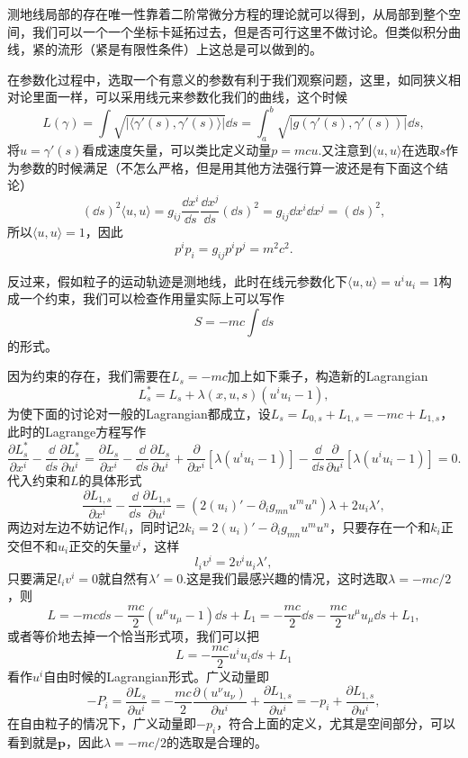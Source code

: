 测地线局部的存在唯一性靠着二阶常微分方程的理论就可以得到，从局部到整个空间，我们可以一个一个坐标卡延拓过去，但是否可行这里不做讨论。但类似积分曲线，紧的流形（紧是有限性条件）上这总是可以做到的。

在参数化过程中，选取一个有意义的参数有利于我们观察问题，这里，如同狭义相对论里面一样，可以采用线元来参数化我们的曲线，这个时候
\[
	L(\gamma)=\int \sqrt{|\langle\gamma'(s),\gamma'(s)\rangle|}\dd s=\int_a^b \sqrt{|g(\gamma'(s),\gamma'(s))|}\dd s,
\]
将$u=\gamma'(s)$看成速度矢量，可以类比定义动量$p=mcu$.又注意到$\langle u,u\rangle$在选取$s$作为参数的时候满足（不怎么严格，但是用其他方法强行算一波还是有下面这个结论）
\[
	(\dd s)^2\langle u, u\rangle=g_{ij}\frac{\dd x^i}{\dd s}\frac{\dd x^j}{\dd s}(\dd s)^2=g_{ij}\dd x^i\dd x^j=(\dd s)^2,
\]
所以$\langle u, u\rangle=1$，因此
\[
	p^ip_i=g_{ij}p^i p^j=m^2c^2.
\]

反过来，假如粒子的运动轨迹是测地线，此时在线元参数化下$\langle u,u\rangle=u^iu_i=1$构成一个约束，我们可以检查作用量实际上可以写作
\[
	S=-mc \int \dd s
\]
的形式。

因为约束的存在，我们需要在$L_s=-mc$加上如下乘子，构造新的Lagrangian
\[
	L^*_s=L_s+\lambda(x,u,s) (u^i u_i-1),
\]
为使下面的讨论对一般的Lagrangian都成立，设$L_s=L_{0,s}+L_{1,s}=-mc+L_{1,s}$，此时的Lagrange方程写作
\[
\frac{\partial L^*_s}{\partial x^i}-\frac{\dd}{\dd s}\frac{\partial L^*_s}{\partial u^i}=\frac{\partial L_s}{\partial x^i}-\frac{\dd}{\dd s}\frac{\partial L_s}{\partial u^i}+\frac{\partial}{\partial x^i}[\lambda (u^i u_i-1)]-\frac{\dd}{\dd s}\frac{\partial}{\partial u^i}[\lambda(u^i u_i-1)]=0.
\]
代入约束和$L$的具体形式
\[
	\frac{\partial L_{1,s}}{\partial x^i}-\frac{\dd}{\dd s}\frac{\partial L_{1,s}}{\partial u^i}=(2(u_i)'-\partial_ig_{mn}u^mu^n)\lambda+2u_i \lambda',
\]
两边对左边不妨记作$l_i$，同时记$2k_i=2(u_i)'-\partial_ig_{mn}u^mu^n$，只要存在一个和$k_i$正交但不和$u_i$正交的矢量$v^i$，这样
\[
	l_iv^i=2v^iu_i \lambda',
\]
只要满足$l_iv^i=0$就自然有$\lambda'=0$.这是我们最感兴趣的情况，这时选取$\lambda = -mc/2$，则
\[
	L=-mc\dd s-\frac{mc}{2}(u^\mu u_\mu-1)\dd s+L_1=-\frac{mc}{2}\dd s-\frac{mc}{2}u^\mu u_\mu\dd s+L_1,
\]
或者等价地去掉一个恰当形式项，我们可以把
\begin{equation}
	L=-\frac{mc}{2}u^i u_i\dd s+L_1
	\label{freeparticle}
\end{equation}
看作$u^i$自由时候的Lagrangian形式。广义动量即
\[
	-P_i=\frac{\partial L_s}{\partial u^i}=-\frac{mc}{2}\frac{\partial (u^\nu u_\nu)}{\partial u^i}+\frac{\partial L_{1,s}}{\partial u^i}=-p_i+\frac{\partial L_{1,s}}{\partial u^i},
\]
在自由粒子的情况下，广义动量即$-p_i$，符合上面的定义，尤其是空间部分，可以看到就是$\bm{p}$，因此$\lambda = -mc/2$的选取是合理的。

